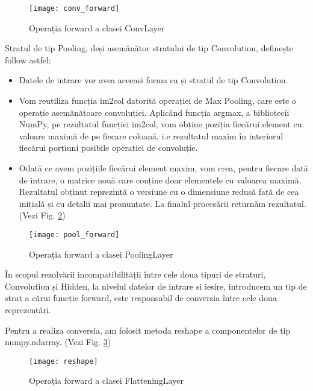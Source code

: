 	\vfill
	
	\begin{figure}[H]
		\texttt{[image: conv\_forward]}  
		\caption{\label{fig:conv_forward} Operația forward a clasei ConvLayer}
	\end{figure}

	
	Stratul de tip Pooling, deși asemănător stratului de tip Convolution, definește follow astfel:
	
	\begin{itemize}
	\item	Datele de intrare vor avea aceeasi forma ca și stratul de tip Convolution. 
	
	\item	Vom reutiliza funcția im2col datorită operației de Max Pooling, care este o operație asemănătoare convoluției. Aplicând funcția argmax, a bibliotecii NumPy, pe rezultatul funcției im2col, vom obține poziția fiecărui element cu valoare maximă de pe fiecare coloană, i.e rezultatul maxim în interiorul fiecărui porțiuni posibile operației de convoluție. 
	
	\item	Odată ce avem pozițiile fiecărui element maxim, vom crea, pentru fiecare dată de intrare, o matrice nouă care conține doar elementele cu valoarea maximă. Rezultatul obținut reprezintă o versiune cu o dimensiune redusă față de cea inițială și cu detalii mai pronunțate. La finalul procesării returnăm rezultatul.	(Vezi Fig. \ref{fig:pool_forward})
	\end{itemize}

	\vfill
	
	\begin{figure}[H]
		\texttt{[image: pool\_forward]}  
		\caption{\label{fig:pool_forward} Operația forward a clasei PoolingLayer}
	\end{figure}
	
	
	În scopul rezolvării incompatibilității între cele doua tipuri de straturi, Convolution și Hidden, la nivelul datelor de intrare si iesire, introducem un tip de strat a cărui funcție forward, este responsabil de conversia între cele doua reprezentări.
	 
	Pentru a realiza conversia, am folosit metoda reshape a componentelor de tip numpy.ndarray. (Vezi Fig. \ref{fig:reshape})
	
	\begin{figure}[H]
		\texttt{[image: reshape]}  
		\caption{\label{fig:reshape} Operația forward a clasei FlatteningLayer}
	\end{figure}
	
